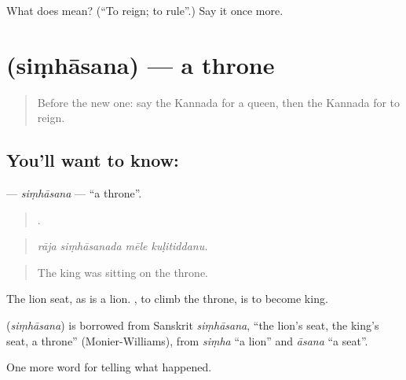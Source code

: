 \begin{tcolorbox}[breakable,colback=teal!4,colframe=teal!35!black,title={Before you move on}]
What does  mean? (\textquotedblleft{}To reign; to rule\textquotedblright{}.) Say it once more.
\end{tcolorbox}
\section[\texorpdfstring{\kn{ಸಿಂಹಾಸನ} (siṃhāsana)}{ಸಿಂಹಾಸನ (siṃhāsana)}]{ (siṃhāsana) — a throne}

\label{lesson:KA-C322-simhasana}



\begin{quote}
Before the new one: say the Kannada for a queen, then the Kannada for to reign.
\end{quote}

\subsection*{You'll want to know: }
\textbf{} — \emph{siṃhāsana} — \textquotedblleft{}a throne\textquotedblright{}.

\begin{quote}
   .
\end{quote}

\begin{quote}
\emph{rāja siṃhāsanada mēle kuḷitiddanu.}
\end{quote}

\begin{quote}
The king was sitting on the throne.
\end{quote}

The lion seat, as  is a lion.  , to climb the throne, is to become king.

\begin{cousinweb}
\textbf{} (\emph{siṃhāsana}) is borrowed from Sanskrit \emph{siṃhāsana}, \textquotedblleft{}the lion's seat, the king's seat, a throne\textquotedblright{} (Monier-Williams), from \emph{siṃha} \textquotedblleft{}a lion\textquotedblright{} and \emph{āsana} \textquotedblleft{}a seat\textquotedblright{}.
\end{cousinweb}

\begin{grammarlens}[title={What you've built}]
One more word for telling what happened.
\end{grammarlens}

